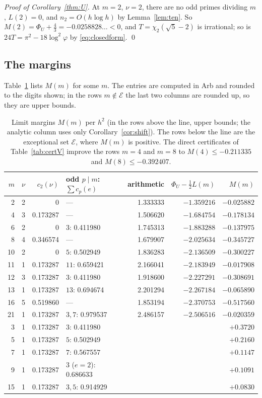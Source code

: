 \documentclass[11pt]{amsart}
\theoremstyle{definition}
\theoremstyle{remark}
\numberwithin{equation}{section}
\newcommand{\cE}{\mathcal{E}}
\begin{document}
\emph{Proof of Corollary~\ref{thm:U}.} At $m=2$, $\nu=2$, there are no odd primes dividing $m$, $L(2)=0$, and
$n_2=O(h\log h)$ by Lemma~\ref{lem:ten}. So $M(2)=\Phi_U+\frac43=-0.0258828\ldots<0$, and
$T=\chi_2(\sqrt5-2)$ is irrational; so is $24T=\pi^2-18\log^2\varphi$ by \eqref{eq:closedform}. \qed

\subsection{The margins}\label{sec:margins}
Table~\ref{tab:margins} lists $M(m)$ for some $m$. The entries are computed in Arb and rounded to the digits shown;
in the rows $m\notin\cE$ the last two columns are rounded up, so they are upper bounds.

\begin{table}[ht]
\centering\footnotesize
\setlength{\tabcolsep}{4pt}
\begin{tabular}{@{}rrrlrrr@{}}
\toprule
$m$ & $\nu$ & $c_2(\nu)$ & odd $p\mid m$: $\sum c_p(e)$ & arithmetic & $\Phi_U-\frac12L(m)$ & $M(m)$\\
\midrule
2 & 2 & 0 & --- & 1.333333 & $-1.359216$ & $-0.025882$\\
4 & 3 & 0.173287 & --- & 1.506620 & $-1.684754$ & $-0.178134$\\
6 & 2 & 0 & $3$: 0.411980 & 1.745313 & $-1.883288$ & $-0.137975$\\
8 & 4 & 0.346574 & --- & 1.679907 & $-2.025634$ & $-0.345727$\\
10 & 2 & 0 & $5$: 0.502949 & 1.836283 & $-2.136509$ & $-0.300227$\\
11 & 1 & 0.173287 & $11$: 0.659421 & 2.166041 & $-2.183949$ & $-0.017908$\\
12 & 3 & 0.173287 & $3$: 0.411980 & 1.918600 & $-2.227291$ & $-0.308691$\\
13 & 1 & 0.173287 & $13$: 0.694674 & 2.201294 & $-2.267184$ & $-0.065890$\\
16 & 5 & 0.519860 & --- & 1.853194 & $-2.370753$ & $-0.517560$\\
21 & 1 & 0.173287 & $3,7$: 0.979537 & 2.486157 & $-2.506516$ & $-0.020359$\\
\midrule
3 & 1 & 0.173287 & $3$: 0.411980 & & & $+0.3720$\\
5 & 1 & 0.173287 & $5$: 0.502949 & & & $+0.2160$\\
7 & 1 & 0.173287 & $7$: 0.567557 & & & $+0.1147$\\
9 & 1 & 0.173287 & $3$ ($e=2$): 0.686633 & & & $+0.1091$\\
15 & 1 & 0.173287 & $3,5$: 0.914929 & & & $+0.0830$\\
\bottomrule
\end{tabular}
\caption{Limit margins $M(m)$ per $h^2$ (in the rows above the line, upper bounds; the analytic column uses only
Corollary~\ref{cor:shift}). The rows below the line are the exceptional set $\cE$, where $M(m)$ is positive. The direct certificates of
Table~\ref{tab:certV} improve the rows $m=4$ and $m=8$ to $M(4)\le-0.211335$ and $M(8)\le-0.392407$.}\label{tab:margins}
\end{table}
\end{document}
